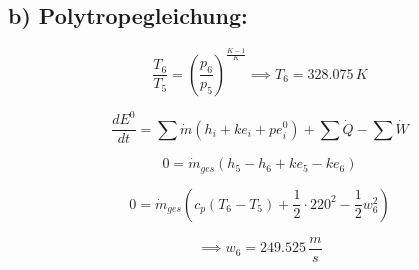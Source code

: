 \subsection*{b) Polytropegleichung:}

\[
\frac{T_6}{T_5} = \left( \frac{p_6}{p_5} \right)^{\frac{K-1}{K}} \implies T_6 = 328.075 \, K
\]

\[
\frac{dE^0}{dt} = \sum \dot{m} (h_i + ke_i + pe_i^0) + \sum \dot{Q} - \sum \dot{W}
\]

\[
0 = \dot{m}_{ges} (h_5 - h_6 + ke_5 - ke_6)
\]

\[
0 = \dot{m}_{ges} \left( c_p \left( T_6 - T_5 \right) + \frac{1}{2} \cdot 220^2 - \frac{1}{2} w_6^2 \right)
\]

\[
\implies w_6 = 249.525 \, \frac{m}{s}
\]